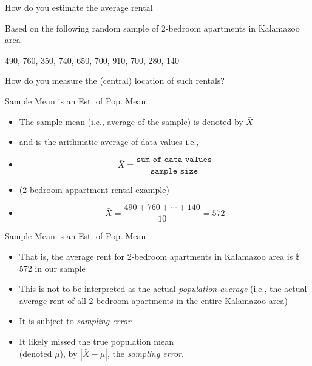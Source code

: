 \documentclass[14pt]{beamer}\usepackage[]{graphicx}\usepackage[]{color}
\begin{document}
\begin{frame}[fragile]{How do you estimate the average rental}

Based on the following random sample of 2-bedroom apartments in Kalamazoo area

\vspace{3mm}



  490, 760, 350, 740, 650, 700, 910, 700, 280, 140
  
\vspace{3mm}

  How do you measure the (central) location of such rentals?

\end{frame}

\begin{frame}[fragile]{Sample Mean is an Est. of Pop. Mean}

\begin{itemize}
\item<1-> The sample mean (i.e., average of the sample) is denoted by $\bar{X}$
\item<2-> and is the arithmatic average of data values  i.e.,
\item<3->
\begin{equation*}
\bar{X} = \frac{\texttt{sum of data values}}{\texttt{sample size}}
\end{equation*}
\item<4-> (2-bedroom appartment rental example)
\item<5->
\begin{equation*}
\bar{X} = \frac{490 + 760 + \cdots + 140}{10} = 572
\end{equation*}
\end{itemize}

\end{frame}
 
\begin{frame}[fragile]{Sample Mean is an Est. of Pop. Mean}

\begin{itemize}
\item<1-> That is, the average rent for 2-bedroom apartments in  Kalamazoo area is \$ 572 in our sample
\item<2-> This is not to be interpreted as the actual \textit{population average}  (i.e., the actual average rent of all 2-bedroom apartments in  the entire Kalamazoo area)
\item<3-> It is subject to \textit{sampling error}
\item<4-> It likely missed the true population mean \\ (denoted $\mu$), by $| \bar{X} - \mu |$,  the \textit{sampling error}.
\end{itemize}

\end{frame}
\end{document}
